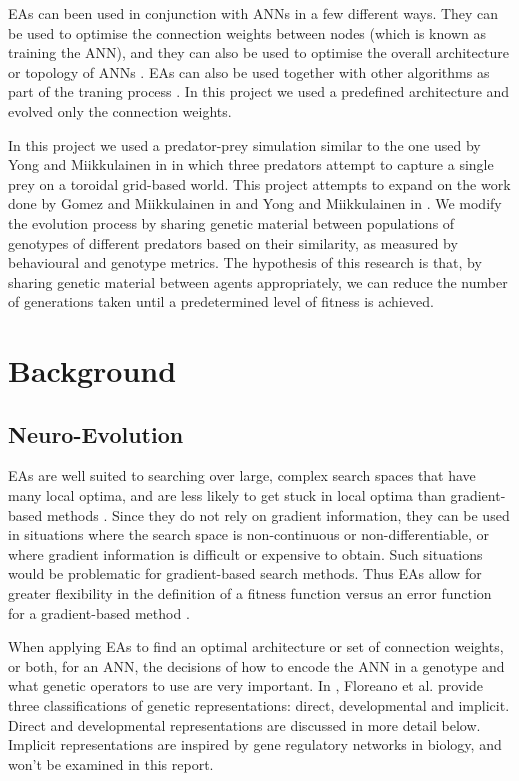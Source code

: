 \documentclass[12pt]{article} %
\begin{document}
EAs can been used in conjunction with ANNs in a few different ways. They can be used to optimise the connection weights between nodes (which is known as training the ANN), and they can also be used to optimise the overall architecture or topology of ANNs \cite{Yao1999}. EAs can also be used together with other algorithms as part of the traning process \cite{Yao1999}. In this project we used a predefined architecture and evolved only the connection weights.

In this project we used a predator-prey simulation similar to the one used by Yong and Miikkulainen in \cite{Yong2001} in which three predators attempt to capture a single prey on a toroidal grid-based world. This project attempts to expand on the work done by Gomez and Miikkulainen in \cite{Gomez1997} and Yong and Miikkulainen in \cite{Yong2001}. We modify the evolution process by sharing genetic material between populations of genotypes of different predators based on their similarity, as measured by behavioural and genotype metrics. The hypothesis of this research is that, by sharing genetic material between agents appropriately, we can reduce the number of generations taken until a predetermined level of fitness is achieved.

\section{Background}

\subsection{Neuro-Evolution}

EAs are well suited to searching over large, complex search spaces that have many local optima, and are less likely to get stuck in local optima than gradient-based methods \cite{Yao1999}. Since they do not rely on gradient information, they can be used in situations where the search space is non-continuous or non-differentiable, or where gradient information is difficult or expensive to obtain. Such situations would be problematic for gradient-based search methods. Thus EAs allow for greater flexibility in the definition of a fitness function versus an error function for a gradient-based method \cite{Floreano2008}\cite{Yao1999}.

When applying EAs to find an optimal architecture or set of connection weights, or both, for an ANN, the decisions of how to encode the ANN in a genotype and what genetic operators to use are very important. In \cite{Floreano2008}, Floreano et al. provide three classifications of genetic representations: direct, developmental and implicit. Direct and developmental representations are discussed in more detail below. Implicit representations are inspired by gene regulatory networks in biology, and won't be examined in this report.
\end{document}
